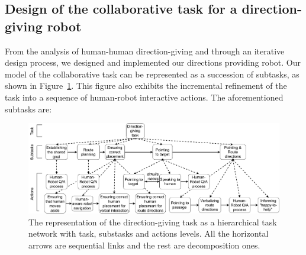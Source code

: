 \documentclass[a4paper,11pt,twoside]{StyleThese}
\begin{document}
\subsection{Design of the collaborative task for a direction-giving robot}\label{sec:guiding}

From the analysis of human-human direction-giving and through an iterative design process, we designed and implemented our directions providing robot. Our model of the collaborative task can be represented as a succession of subtasks, as shown in Figure~\ref{fig:chap3_HTN}. This figure also exhibits the incremental refinement of the task into a sequence of human-robot interactive actions. The aforementioned subtasks are:

\begin{figure}[!t]
	\centering
	\includegraphics[width=\linewidth]{figures/chapter3/HTN-guiding_task.pdf}
	\caption{The representation of the direction-giving task as a hierarchical task network with task, substasks and actions levels. All the horizontal arrows are sequential links and the rest are decomposition ones.}
	\label{fig:chap3_HTN}
\end{figure}
\end{document}
